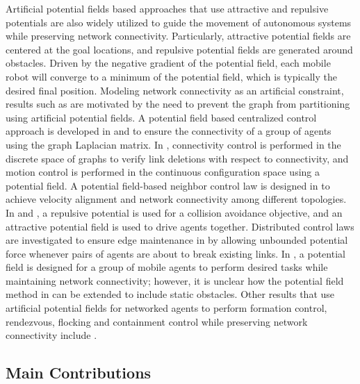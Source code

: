 \documentclass[english]{IOS-Book-Article}
\theoremstyle{definition}
\theoremstyle{definition}
\begin{document}
Artificial potential fields based approaches that use attractive and
repulsive potentials are also widely utilized to guide the movement
of autonomous systems while preserving network connectivity. Particularly,
attractive potential fields are centered at the goal locations, and
repulsive potential fields are generated around obstacles. Driven
by the negative gradient of the potential field, each mobile robot
will converge to a minimum of the potential field, which is typically
the desired final position. Modeling network connectivity as an artificial
constraint, results such as \cite{Zavlanos2007a,Zavlanos2008,Zavlanos2009TAC,dimarogonas2008_R,ghaffarkhah_2009,dimarogonas2007,Olfati-Saber2004,Dimarogonas2010,meng2007}
are motivated by the need to prevent the graph from partitioning using
artificial potential fields. A potential field based centralized control
approach is developed in \cite{Zavlanos2007a} and \cite{Olfati-Saber2004}
to ensure the connectivity of a group of agents using the graph Laplacian
matrix. In \cite{Zavlanos2008}, connectivity control is performed
in the discrete space of graphs to verify link deletions with respect
to connectivity, and motion control is performed in the continuous
configuration space using a potential field. A potential field-based
neighbor control law is designed in \cite{Zavlanos2009TAC} to achieve
velocity alignment and network connectivity among different topologies.
In \cite{dimarogonas2008_R} and \cite{dimarogonas2007}, a repulsive
potential is used for a collision avoidance objective, and an attractive
potential field is used to drive agents together. Distributed control
laws are investigated to ensure edge maintenance in \cite{meng2007}
by allowing unbounded potential force whenever pairs of agents are
about to break existing links. In \cite{Dimarogonas2010}, a potential
field is designed for a group of mobile agents to perform desired
tasks while maintaining network connectivity; however, it is unclear
how the potential field method in \cite{Dimarogonas2010} can be extended
to include static obstacles. Other results that use artificial potential
fields for networked agents to perform formation control, rendezvous,
flocking and containment control while preserving network connectivity
include \cite{Kan2010a,Kan2010,Kan2011,Kan2011a,Kan.Klotz.ea2012,Kan.Pasiliao.ea2012,Kan.Shea.ea2012,Kan.Klotz.ea2013,Su2010a,Xiao.Wang.ea2012,Navaravong.Kan.ea2012}. 


\subsection{Main Contributions}
\end{document}
